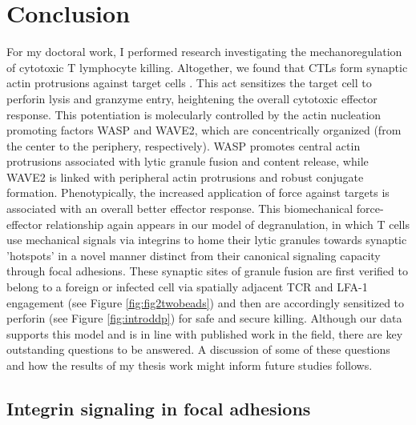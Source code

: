 \section{Conclusion} 

For my doctoral work, I performed research investigating the mechanoregulation of cytotoxic T lymphocyte killing. Altogether, we found that CTLs form synaptic actin protrusions against target cells \cite{Tamzalit2018}. This act sensitizes the target cell to perforin lysis and granzyme entry, heightening the overall cytotoxic effector response. This potentiation is molecularly controlled by the actin nucleation promoting factors WASP and WAVE2, which are concentrically organized (from the center to the periphery, respectively). WASP promotes central actin protrusions associated with lytic granule fusion and content release, while WAVE2 is linked with peripheral actin protrusions and robust conjugate formation. Phenotypically, the increased application of force against targets is associated with an overall better effector response. This biomechanical force-effector relationship again appears in our model of degranulation, in which T cells use mechanical signals via integrins to home their lytic granules towards synaptic 'hotspots' in a novel manner distinct from their canonical signaling capacity through focal adhesions. These synaptic sites of granule fusion are first verified to belong to a foreign or infected cell via spatially adjacent TCR and LFA-1 engagement (see Figure \ref{fig:fig2twobeads}) and then are accordingly sensitized to perforin (see Figure \ref{fig:introddp}) for safe and secure killing. Although our data supports this model and is in line with published work in the field, there are key outstanding questions to be answered. A discussion of some of these questions and how the results of my thesis work might inform future studies follows.

\subsection{Integrin signaling in focal adhesions}


